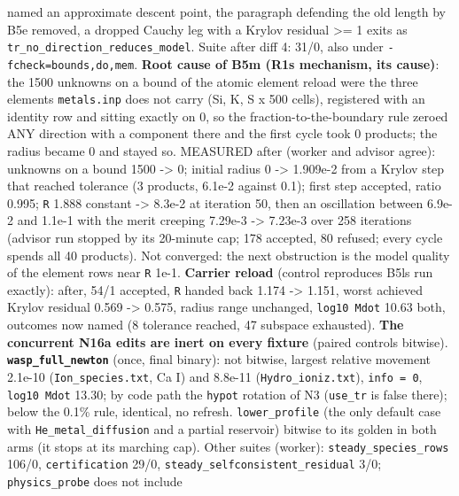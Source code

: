 \documentclass[english,a4paper]{my_memo}
\begin{document}
\begin{itemize}
  named an approximate descent point, the paragraph defending the old
  length by B5e removed, a dropped Cauchy leg with a Krylov residual \textgreater= 1
  exits as \texttt{tr\_no\_direction\_reduces\_model}. Suite after diff 4: 31/0, also
  under \texttt{-fcheck=bounds,do,mem}. \textbf{Root cause of B5m (R1\textquotesingle s mechanism, its
  cause)}: the 1500 unknowns on a bound of the atomic element reload were
  the three elements \texttt{metals.inp} does not carry (Si, K, S x 500 cells),
  registered with an identity row and sitting exactly on 0, so the
  fraction-to-the-boundary rule zeroed ANY direction with a component there
  and the first cycle took 0 products; the radius became 0 and stayed so.
  MEASURED after (worker and advisor agree): unknowns on a bound 1500 -\textgreater{} 0;
  initial radius 0 -\textgreater{} 1.909e-2 from a Krylov step that reached tolerance (3
  products, 6.1e-2 against 0.1); first step accepted, ratio 0.995; \texttt{\textbar{}\textbar{}R\textbar{}\textbar{}}
  1.888 constant -\textgreater{} 8.3e-2 at iteration 50, then an oscillation between
  6.9e-2 and 1.1e-1 with the merit creeping 7.29e-3 -\textgreater{} 7.23e-3 over 258
  iterations (advisor run stopped by its 20-minute cap; 178 accepted, 80
  refused; every cycle spends all 40 products). Not converged: the next
  obstruction is the model quality of the element rows near \texttt{\textbar{}\textbar{}R\textbar{}\textbar{}} 1e-1.
  \textbf{Carrier reload} (control reproduces B5l\textquotesingle s run exactly): after, 54/1
  accepted, \texttt{\textbar{}\textbar{}R\textbar{}\textbar{}} handed back 1.174 -\textgreater{} 1.151, worst achieved Krylov
  residual 0.569 -\textgreater{} 0.575, radius range unchanged, \texttt{log10\ Mdot} 10.63 both,
  outcomes now named (8 tolerance reached, 47 subspace exhausted). \textbf{The
  concurrent N16a edits are inert on every fixture} (paired controls
  bitwise). \textbf{\texttt{wasp\_full\_newton}} (once, final binary): not bitwise,
  largest relative movement 2.1e-10 (\texttt{Ion\_species.txt}, Ca I) and 8.8e-11
  (\texttt{Hydro\_ioniz.txt}), \texttt{info\ =\ 0}, \texttt{log10\ Mdot} 13.30; by code path the
  \texttt{hypot} rotation of N3 (\texttt{use\_tr} is false there); below the 0.1\% rule,
  identical, no refresh. \texttt{lower\_profile} (the only default case with
  \texttt{He\_metal\_diffusion} and a partial reservoir) bitwise to its golden in
  both arms (it stops at its marching cap). Other suites (worker):
  \texttt{steady\_species\_rows} 106/0, \texttt{certification} 29/0,
  \texttt{steady\_selfconsistent\_residual} 3/0; \texttt{physics\_probe} does not include

\end{itemize}
\end{document}

